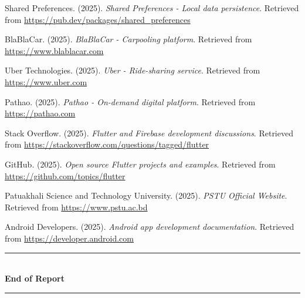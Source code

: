 \documentclass[12pt,a4paper]{article}
\begin{document}
\begin{enumerate}[label={[\arabic*]}]
    \item Shared Preferences. (2025). \textit{Shared Preferences - Local data persistence}. Retrieved from \url{https://pub.dev/packages/shared_preferences}
    
    \item BlaBlaCar. (2025). \textit{BlaBlaCar - Carpooling platform}. Retrieved from \url{https://www.blablacar.com}
    
    \item Uber Technologies. (2025). \textit{Uber - Ride-sharing service}. Retrieved from \url{https://www.uber.com}
    
    \item Pathao. (2025). \textit{Pathao - On-demand digital platform}. Retrieved from \url{https://pathao.com}
    
    \item Stack Overflow. (2025). \textit{Flutter and Firebase development discussions}. Retrieved from \url{https://stackoverflow.com/questions/tagged/flutter}
    
    \item GitHub. (2025). \textit{Open source Flutter projects and examples}. Retrieved from \url{https://github.com/topics/flutter}
    
    \item Patuakhali Science and Technology University. (2025). \textit{PSTU Official Website}. Retrieved from \url{https://www.pstu.ac.bd}
    
    \item Android Developers. (2025). \textit{Android app development documentation}. Retrieved from \url{https://developer.android.com}
\end{enumerate}

\vspace{1cm}

\begin{center}
\rule{0.8\textwidth}{0.4pt}\\[0.3cm]
{\large \textbf{End of Report}}\\[0.2cm]
\rule{0.8\textwidth}{0.4pt}
\end{center}
\end{document}
